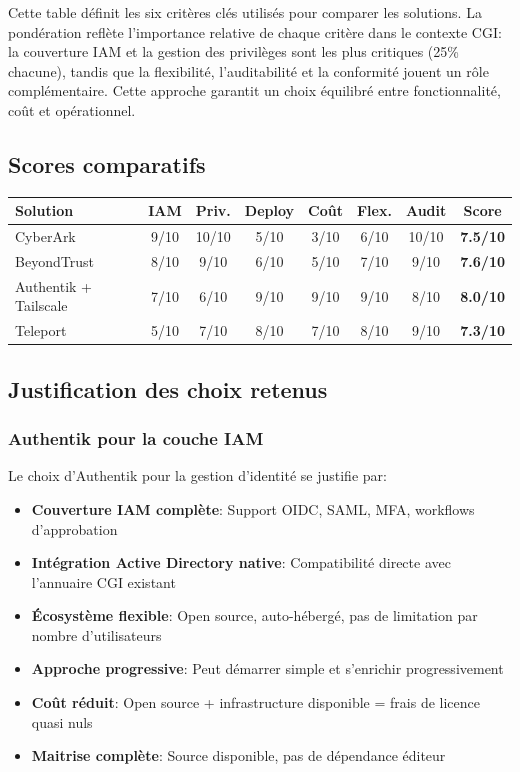 Cette table définit les six critères clés utilisés pour comparer les solutions. La pondération reflète l'importance relative de chaque critère dans le contexte CGI: la couverture IAM et la gestion des privilèges sont les plus critiques (25\% chacune), tandis que la flexibilité, l'auditabilité et la conformité jouent un rôle complémentaire. Cette approche garantit un choix équilibré entre fonctionnalité, coût et opérationnel.
\newpage
\subsection{Scores comparatifs}

\begin{table}[h]
\centering
\begin{tabularx}{\textwidth}{|l|c|c|c|c|c|c|c|}
\hline
\textbf{Solution} & \textbf{IAM} & \textbf{Priv.} & \textbf{Deploy} & \textbf{Coût} & \textbf{Flex.} & \textbf{Audit} & \textbf{Score} \\
\hline
CyberArk & 9/10 & 10/10 & 5/10 & 3/10 & 6/10 & 10/10 & \textbf{7.5/10} \\
\hline
BeyondTrust & 8/10 & 9/10 & 6/10 & 5/10 & 7/10 & 9/10 & \textbf{7.6/10} \\
\hline
Authentik + Tailscale & 7/10 & 6/10 & 9/10 & 9/10 & 9/10 & 8/10 & \textbf{8.0/10} \\
\hline
Teleport & 5/10 & 7/10 & 8/10 & 7/10 & 8/10 & 9/10 & \textbf{7.3/10} \\
\hline

\end{tabularx}
\end{table}

\subsection{Justification des choix retenus}

\subsubsection{Authentik pour la couche IAM}

Le choix d'Authentik pour la gestion d'identité se justifie par:
\begin{itemize}
    \item \textbf{Couverture IAM complète}: Support OIDC, SAML, MFA, workflows d'approbation
    \item \textbf{Intégration Active Directory native}: Compatibilité directe avec l'annuaire CGI existant
    \item \textbf{Écosystème flexible}: Open source, auto-hébergé, pas de limitation par nombre d'utilisateurs
    \item \textbf{Approche progressive}: Peut démarrer simple et s'enrichir progressivement
    \item \textbf{Coût réduit}: Open source + infrastructure disponible = frais de licence quasi nuls
    \item \textbf{Maitrise complète}: Source disponible, pas de dépendance éditeur
\end{itemize}

